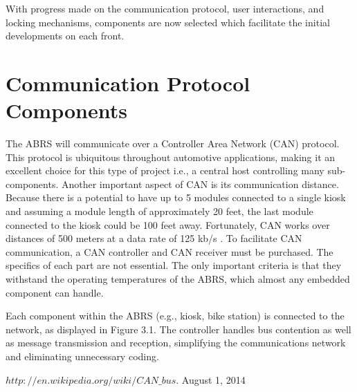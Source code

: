 \documentclass[11pt,a4paper,onesides]{report}
\begin{document}
With progress made on the communication protocol, user interactions, and locking mechanisms, components are now selected which facilitate the initial developments on each front.

\section{Communication Protocol Components}

The ABRS will communicate over a Controller Area Network (CAN) protocol.  This protocol is ubiquitous throughout automotive applications, making it an excellent choice for this type of project i.e., a central host controlling many sub-components.  Another important aspect of CAN is its communication distance.  Because there is a potential to have up to 5 modules connected to a single kiosk and assuming a module length of approximately 20 feet, the last module connected to the kiosk could be 100 feet away.  Fortunately, CAN works over distances of 500 meters at a data rate of 125 kb/s \cite{CAN protocol}.  To facilitate CAN communication, a CAN controller and CAN receiver must be purchased.  The specifics of each part are not essential.  The only important criteria is that they withstand the operating temperatures of the ABRS, which almost any embedded component can handle.  

Each component within the ABRS (e.g., kiosk, bike station) is connected to the network, as displayed in Figure 3.1.  The controller handles bus contention as well as message transmission and reception, simplifying the communications network and eliminating unnecessary coding. 


\begin{thebibliography}{10}

  
  \emph{$http://en.wikipedia.org/wiki/CAN\_bus$}.
  August 1, 2014

\end{thebibliography}
\end{document}
